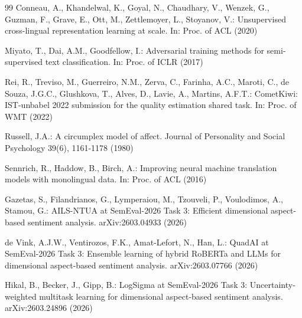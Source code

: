 \documentclass[runningheads]{llncs}
\begin{document}
\begin{thebibliography}{99}
Conneau, A., Khandelwal, K., Goyal, N., Chaudhary, V., Wenzek, G.,
Guzman, F., Grave, E., Ott, M., Zettlemoyer, L., Stoyanov, V.:
Unsupervised cross-lingual representation learning at scale. In: Proc.
of ACL (2020)

Miyato, T., Dai, A.M., Goodfellow, I.:
Adversarial training methods for semi-supervised text classification.
In: Proc. of ICLR (2017)

Rei, R., Treviso, M., Guerreiro, N.M., Zerva, C., Farinha, A.C.,
Maroti, C., de Souza, J.G.C., Glushkova, T., Alves, D., Lavie, A.,
Martins, A.F.T.:
CometKiwi: IST-unbabel 2022 submission for the quality estimation
shared task. In: Proc. of WMT (2022)

Russell, J.A.:
A circumplex model of affect. Journal of Personality and Social
Psychology 39(6), 1161-1178 (1980)

Sennrich, R., Haddow, B., Birch, A.:
Improving neural machine translation models with monolingual data. In:
Proc. of ACL (2016)

Gazetas, S., Filandrianos, G., Lymperaiou, M., Tzouveli, P.,
Voulodimos, A., Stamou, G.:
AILS-NTUA at SemEval-2026 Task 3: Efficient dimensional
aspect-based sentiment analysis.
arXiv:2603.04933 (2026)

de Vink, A.J.W., Ventirozos, F.K., Amat-Lefort, N., Han, L.:
QuadAI at SemEval-2026 Task 3: Ensemble learning of hybrid RoBERTa and
LLMs for dimensional aspect-based sentiment analysis.
arXiv:2603.07766 (2026)

Hikal, B., Becker, J., Gipp, B.:
LogSigma at SemEval-2026 Task 3: Uncertainty-weighted multitask
learning for dimensional aspect-based sentiment analysis.
arXiv:2603.24896 (2026)

\end{thebibliography}
\end{document}
